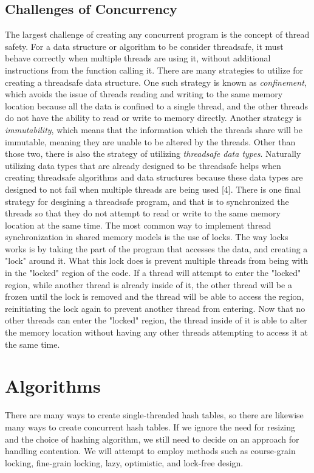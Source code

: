 \documentclass[conference]{IEEEtran}
\begin{document}
\subsection{Challenges of Concurrency}
The largest challenge of creating any concurrent program is the concept of thread safety. For a data structure or algorithm to be consider threadsafe, it 
must behave correctly when multiple threads are using it, without additional instructions from the function calling it. There are many strategies to utilize for
creating a threadsafe data structure. One such strategy is known as \emph{confinement}, which avoids the issue of threads reading and writing to the same
memory location because all the data is confined to a single thread, and the other threads do not have the ability to read or write to memory directly.
Another strategy is \emph{immutability}, which means that the information which the threads share will be immutable, meaning they are unable to be altered by
the threads. Other than those two, there is also the strategy of utilizing \emph{threadsafe data types}. Naturally utilizing data types that are already designed
to be threadsafe helps when creating threadsafe algorithms and data structures because these data types are designed to not fail when multiple threads are being used
[4]. There is one final strategy for desgining a threadsafe program, and that is to synchronized the threads so that they do not attempt to read or write to the same
memory location at the same time. The most common way to implement thread synchronization in shared memory models is the use of locks. The way locks works is by taking
the part of the program that accesses the data, and creating a "lock" around it. What this lock does is prevent multiple threads from being with in the "locked" region
of the code. If a thread will attempt to enter the "locked" region, while another thread is already inside of it, the other thread will be a frozen 
until the lock is removed and the thread will be able to access the region, reinitiating the lock again to prevent another thread from entering. Now that no other threads
can enter the "locked" region, the thread inside of it is able to alter the memory location without having any other threads attempting to access it at the same time.

\section{Algorithms}
There are many ways to create single-threaded hash tables, so there are likewise many ways to create concurrent hash tables. If we ignore the need for resizing and
the choice of hashing algorithm, we still need to decide on an approach for handling contention. We will attempt to employ methods such as course-grain locking, fine-grain locking,
lazy, optimistic, and lock-free design. 
\end{document}
